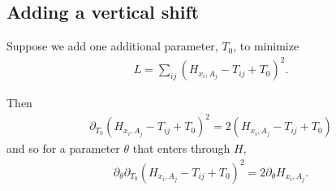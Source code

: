 \documentclass{article}
\begin{document}
\subsection{Adding a vertical shift}

Suppose we add one additional parameter, $T_0$, to minimize
\begin{align}
  L = \sum_{ij} \left( H_{x_i,A_j} - T_{ij} + T_0 \right)^2 .
\end{align}

Then
\begin{align}
    \partial_{T_0} \left(H_{x_i,A_j} - T_{ij} + T_0 \right)^2 = 2 \left(H_{x_i,A_j} - T_{ij} + T_0 \right)
\end{align}
and so for a parameter $\theta$ that enters through $H$,
\begin{align}
    \partial_\theta \partial_{T_0} \left(H_{x_i,A_j} - T_{ij} + T_0 \right)^2 = 2 \partial_\theta H_{x_i,A_j}  .
\end{align}
\end{document}
